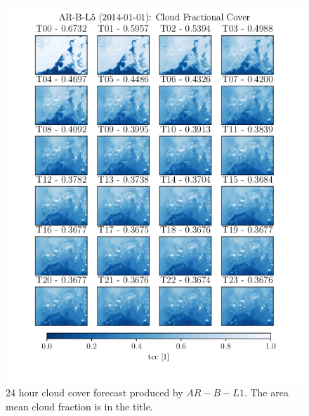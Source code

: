 \begin{figure}
    \centering
    \includegraphics{python_figs/AR-B-L5_timelapse_cloud_cover_24hrs_from_2014_01_01.png}
    \caption{24 hour cloud cover forecast produced by $AR-B-L1$. The area mean  cloud fraction is in the title.}
    \label{fig:timelapse_ar}
\end{figure}

\cleardoublepage
